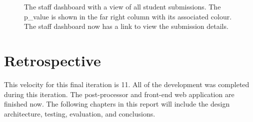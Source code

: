 \begin{figure}[H]
  \centering
  \caption[Web Staff Dashboard All Submissions]{The staff dashboard with a view of all student submissions. The p\_value is shown in the far right column with its associated colour. The staff dashboard now has a link to view the submission details.}
  \label{fig:web-all-submissions}
\end{figure}

\section{Retrospective}
This velocity for this final iteration is 11. All of the development was completed during this iteration. The post-processor and front-end web application are finished now. The following chapters in this report will include the design architecture, testing, evaluation, and conclusions.
